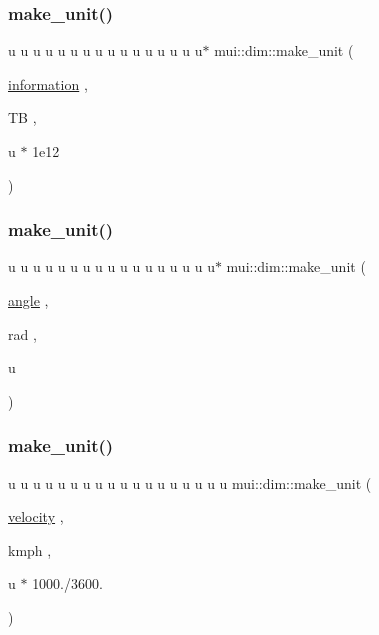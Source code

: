 \mbox{\label{namespacemui_1_1dim_abe710ea9ab7c35485528c4d051d7fd11}} 
\subsubsection{\texorpdfstring{make\+\_\+unit()}{make\_unit()}\hspace{0.1cm}{\footnotesize\ttfamily [17/32]}}
{\footnotesize\ttfamily u u u u u u u u u u u u u u u u$\ast$ mui\+::dim\+::make\+\_\+unit (\begin{DoxyParamCaption}\item[{\hyperlink{namespacemui_1_1dim_abee516dc27b7ef30e706ffc9ce0ea363}{information}}]{,  }\item[{TB}]{,  }\item[{u $\ast$}]{1e12 }\end{DoxyParamCaption})}

\mbox{\label{namespacemui_1_1dim_a4a65bae6ab0b0f920231fdc303b4f07a}} 
\subsubsection{\texorpdfstring{make\+\_\+unit()}{make\_unit()}\hspace{0.1cm}{\footnotesize\ttfamily [18/32]}}
{\footnotesize\ttfamily u u u u u u u u u u u u u u u u u$\ast$ mui\+::dim\+::make\+\_\+unit (\begin{DoxyParamCaption}\item[{\hyperlink{namespacemui_1_1dim_a967db7ab1d1127cdb94fe084e592d1e0}{angle}}]{,  }\item[{rad}]{,  }\item[{u}]{ }\end{DoxyParamCaption})}

\mbox{\label{namespacemui_1_1dim_a1e2546f00c48ea57ce4f21f4a087c2fd}} 
\subsubsection{\texorpdfstring{make\+\_\+unit()}{make\_unit()}\hspace{0.1cm}{\footnotesize\ttfamily [19/32]}}
{\footnotesize\ttfamily u u u u u u u u u u u u u u u u u u mui\+::dim\+::make\+\_\+unit (\begin{DoxyParamCaption}\item[{\hyperlink{namespacemui_1_1dim_a2ed9711eaaf9db79861b69ffa35d277d}{velocity}}]{,  }\item[{kmph}]{,  }\item[{u $\ast$}]{1000./3600. }\end{DoxyParamCaption})}

